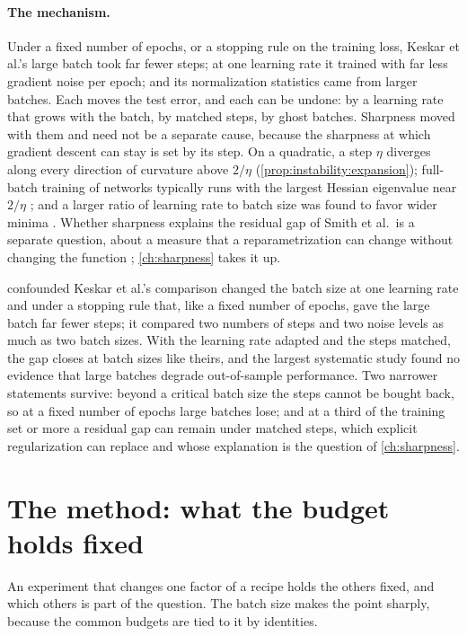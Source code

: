 \begin{refsection}
\paragraph{The mechanism.} Under a fixed number of epochs, or a stopping rule on the training loss, Keskar et al.'s large batch took far fewer steps; at one learning rate it trained with far less gradient noise per epoch; and its normalization statistics came from larger batches. Each moves the test error, and each can be undone: by a learning rate that grows with the batch, by matched steps, by ghost batches. Sharpness moved with them and need not be a separate cause, because the sharpness at which gradient descent can stay is set by its step. On a quadratic, a step $\eta$ diverges along every direction of curvature above $2/\eta$ (\cref{prop:instability:expansion}); full-batch training of networks typically runs with the largest Hessian eigenvalue near $2/\eta$ \parencite{CohenEtAl2021}; and a larger ratio of learning rate to batch size was found to favor wider minima \parencite{JastrzebskiEtAl2018}. Whether sharpness explains the residual gap of Smith et al.\ is a separate question, about a measure that a reparametrization can change without changing the function \parencite{DinhEtAl2017}; \cref{ch:sharpness} takes it up.

\begin{verdict}{confounded}
Keskar et al.'s comparison changed the batch size at one learning rate and under a stopping rule that, like a fixed number of epochs, gave the large batch far fewer steps; it compared two numbers of steps and two noise levels as much as two batch sizes. With the learning rate adapted and the steps matched, the gap closes at batch sizes like theirs, and the largest systematic study found no evidence that large batches degrade out-of-sample performance. Two narrower statements survive: beyond a critical batch size the steps cannot be bought back, so at a fixed number of epochs large batches lose; and at a third of the training set or more a residual gap can remain under matched steps, which explicit regularization can replace and whose explanation is the question of \cref{ch:sharpness}.
\end{verdict}

\section{The method: what the budget holds fixed}\label{sec:heldfixed:budget}

An experiment that changes one factor of a recipe holds the others fixed, and which others is part of the question. The batch size makes the point sharply, because the common budgets are tied to it by identities.


\end{refsection}
